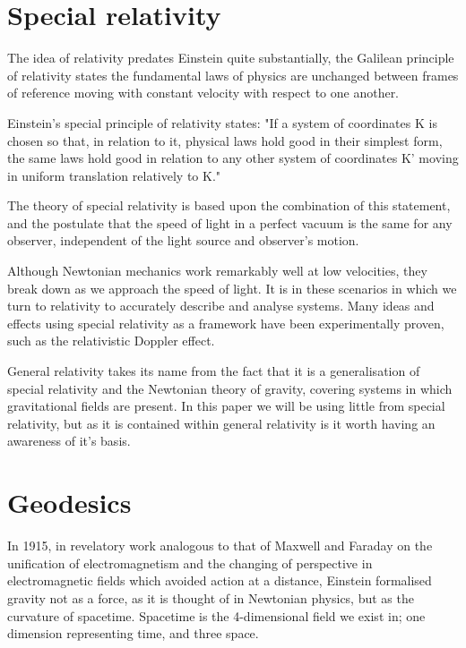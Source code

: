 \documentclass[oneside,openright,frontopenright, singlespacing]{dmathesis}
\begin{document}
\section{Special relativity}\label{sec:Section2.1}

	The idea of relativity predates Einstein quite substantially, the Galilean principle of relativity states the fundamental laws of physics are unchanged between frames of reference moving with constant velocity with respect to one another.

\vspace{1em}
	Einstein's special principle of relativity states\cite{einstein1923grundlage}: "If a system of coordinates K is chosen so that, in relation to it, physical laws hold good in their simplest form, the same laws hold good in relation to any other system of coordinates K' moving in uniform translation relatively to K."

\vspace{1em}
	The theory of special relativity is based upon the combination of this statement, and the postulate that the speed of light in a perfect vacuum is the same for any observer, independent of the light source and observer's motion.

\vspace{1em}
	Although Newtonian mechanics work remarkably well at low velocities, they break down as we approach the speed of light. It is in these scenarios in which we turn to relativity to accurately describe and analyse systems. Many ideas and effects using special relativity as a framework have been experimentally proven, such as the relativistic Doppler effect.

\vspace{1em}
	General relativity takes its name from the fact that it is a generalisation of special relativity and the Newtonian theory of gravity, covering systems in which gravitational fields are present. In this paper we will be using little from special relativity, but as it is contained within general relativity is it worth having an awareness of it's basis.

\section{Geodesics}\label{sec:Section2.2}
	
	In 1915, in revelatory work analogous to that of Maxwell and Faraday on the unification of electromagnetism and the changing of perspective in electromagnetic fields which avoided action at a distance, Einstein formalised gravity not as a force, as it is thought of in Newtonian physics, but as the curvature of spacetime. Spacetime is the 4-dimensional field we exist in; one dimension representing time, and three space. 
\end{document}

